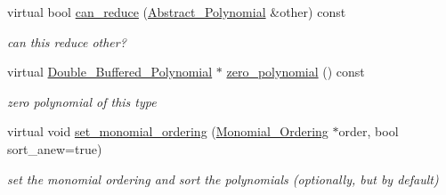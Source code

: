 \begin{Indent}
\begin{DoxyCompactItemize}
\mbox{\label{class_double___buffered___polynomial_a1303fe35f4bdb1d6e3dbfbb6aed5bdd9}} 
virtual bool \hyperlink{class_double___buffered___polynomial_a1303fe35f4bdb1d6e3dbfbb6aed5bdd9}{can\+\_\+reduce} (\hyperlink{class_abstract___polynomial}{Abstract\+\_\+\+Polynomial} \&other) const
\begin{DoxyCompactList}\small\item\em can {\ttfamily this} reduce {\ttfamily other}? \end{DoxyCompactList}\item 
\mbox{\label{class_double___buffered___polynomial_aadeeb207edd8c197cbe23dac7669f586}} 
virtual \hyperlink{class_double___buffered___polynomial}{Double\+\_\+\+Buffered\+\_\+\+Polynomial} $\ast$ \hyperlink{class_double___buffered___polynomial_aadeeb207edd8c197cbe23dac7669f586}{zero\+\_\+polynomial} () const
\begin{DoxyCompactList}\small\item\em zero polynomial of this type \end{DoxyCompactList}\item 
virtual void \hyperlink{class_double___buffered___polynomial_ae0cb00f5657fcc0c51c5c6e9659b89a3}{set\+\_\+monomial\+\_\+ordering} (\hyperlink{class_monomial___ordering}{Monomial\+\_\+\+Ordering} $\ast$order, bool sort\+\_\+anew=true)
\begin{DoxyCompactList}\small\item\em set the monomial ordering and sort the polynomials (optionally, but by default) \end{DoxyCompactList}\end{DoxyCompactItemize}
\end{Indent}
